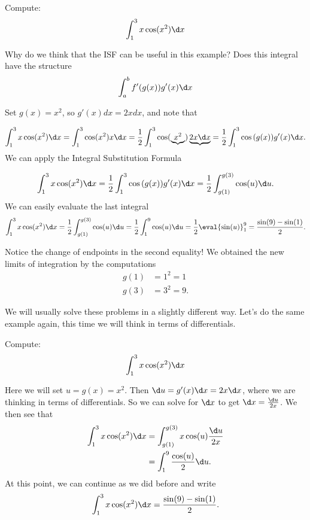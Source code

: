 \documentclass{ximera}
\begin{document}
\begin{example}
Compute:
\[
\int_1^3 x\cos(x^2)\d x
\]
\begin{explanation}
Why do we think that the ISF can be useful in this example?
Does this integral have the structure
\[
\int_a^b f'(g(x)) g'(x) \d x 
\]

Set $g(x) = x^2$, so $g'(x)dx = 2x dx$, and note that

\[
\int_1^3 x\cos(x^2)\d x=
\int_1^3 \cos(x^2)x\d x=\frac{1}{2}\int_1^{3} \cos(\underbrace{x^2})\underbrace{2x\d x}=\frac{1}{2}\int_1^{3} \cos{(g(x))}g'(x)\d x.
\]
We can apply the Integral Substitution Formula

\[
\int_1^3 x\cos(x^2)\d x=
\frac{1}{2}\int_1^{3} \cos{(g(x))}g'(x)\d x=\frac{1}{2}\int_{g(1)}^{g(3)} \cos(u) \d u.
\]
We can easily evaluate the last integral
\[
\int_1^3 x\cos(x^2)\d x=
\frac{1}{2}\int_{g(1)}^{g(3)} \cos(u) \d u=\frac{1}{2}\int_{1}^{9} \cos(u) \d u=\frac{1}{2}\eval{\sin(u)}_1^9= \frac{\sin(9) -\sin(1)}{2}.
\]

Notice the change of endpoints in the second equality!  
We obtained the new limits of integration by the computations
\begin{align*}
g(1) &= 1^2 = 1  \\
g(3) &= 3^2 = 9.
\end{align*}
\end{explanation}
\end{example}

We will usually solve these problems in a slightly different
way. Let's do the same example again, this time we will think in terms
of differentials.

\begin{example}\label{main example}
Compute:
\[
\int_1^3 x\cos(x^2)\d x
\]
\begin{explanation}
Here we will set $u=g(x) = x^2$. Then $\d u =g'(x)\d x=2x\d x$,
where we are thinking in terms of differentials. So we can solve for
$\d x$ to get $\d x = \frac{\d u}{2x}$.  We then see
that
\begin{align*}
  \int_1^3 x \cos(x^2) \d x &= \int_{g(1)}^{g(3)} x \cos(u) \frac{\d u}{2x}\\
  &= \int_{1}^{9} \frac{\cos(u)}{2}\d u .
\end{align*}
At this point, we can continue as we did before and write
\[
\int_1^3 x\cos(x^2)\d x= \frac{\sin(9) -\sin(1)}{2}.
\]
\end{explanation}
\end{example}
\end{document}
